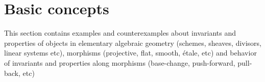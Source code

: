 \documentclass[../main.tex]{subfiles}
\begin{document}
\section{Basic concepts}
This section contains examples and counterexamples about invariants and properties of objects in elementary algebraic geometry (schemes, sheaves, divisors, linear systems etc), morphisms (projective, flat, smooth, \'{e}tale, etc) and behavior of invariants and properties along morphisms (base-change, push-forward, pull-back, etc)
\end{document}
